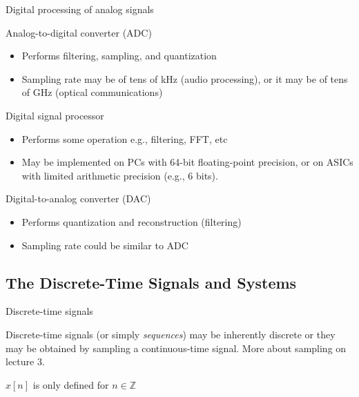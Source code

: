 \documentclass[10pt]{beamer}
\begin{document}
%
\begin{frame}{Digital processing of analog signals}
\vspace{-0.5cm}
\begin{figure}[t!]
	\centering
	\resizebox{\linewidth}{!}{}
	\label{fig:adc-dsp-dac}
\end{figure}
\vspace{-0.5cm}
\begin{block}{Analog-to-digital converter (ADC)}
	\begin{itemize}
		\item Performs filtering, sampling, and quantization
		\item Sampling rate may be of tens of kHz (audio processing), or it may be of tens of GHz (optical communications)
	\end{itemize}
\end{block}
\vspace{-0.3cm}
\begin{block}{Digital signal processor}
	\begin{itemize} \itemsep 0pt
		\item Performs some operation e.g., filtering, FFT, etc
		\item May be implemented on PCs with 64-bit floating-point precision, or on ASICs with limited arithmetic precision (e.g., 6 bits).
	\end{itemize}
\end{block}
\vspace{-0.3cm}
\begin{block}{Digital-to-analog converter (DAC)}
	\begin{itemize}
		\item Performs quantization and reconstruction (filtering)
		\item Sampling rate could be similar to ADC
	\end{itemize}
\end{block}

\end{frame}

\subsection{The Discrete-Time Signals and Systems}
%
\begin{frame}{Discrete-time signals}

Discrete-time signals (or simply \textit{sequences}) may be inherently discrete or they may be obtained by sampling a continuous-time signal. More about sampling on lecture 3.

\begin{figure}[t!]
	\centering
	\resizebox{0.5\linewidth}{!}{}
	\label{fig:ct_signal_sampled}
\end{figure}

$x[n]$ is only defined for $n\in\mathbb{Z}$
\end{frame}
\end{document}
